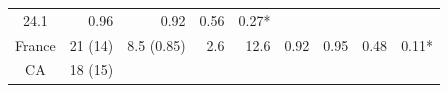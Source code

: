 \documentclass[fleqn,10pt,lineno]{wlpeerj} %
\theoremstyle{definition}
\theoremstyle{definition}
\theoremstyle{definition}
\theoremstyle{remark}
\begin{document}
\begin{longtable}[]{@{}crrrrllrl@{}}
\begin{minipage}[t]{0.05\columnwidth}
24.1\strut
\end{minipage} & \begin{minipage}[t]{0.11\columnwidth}\raggedright\strut
0.96\strut
\end{minipage} & \begin{minipage}[t]{0.06\columnwidth}\raggedright\strut
0.92\strut
\end{minipage} & \begin{minipage}[t]{0.06\columnwidth}\raggedleft\strut
0.56\strut
\end{minipage} & \begin{minipage}[t]{0.07\columnwidth}\raggedright\strut
0.27*\strut
\end{minipage}\tabularnewline
\begin{minipage}[t]{0.12\columnwidth}\centering\strut
France\strut
\end{minipage} & \begin{minipage}[t]{0.08\columnwidth}\raggedleft\strut
21 (14)\strut
\end{minipage} & \begin{minipage}[t]{0.13\columnwidth}\raggedleft\strut
8.5 (0.85)\strut
\end{minipage} & \begin{minipage}[t]{0.04\columnwidth}\raggedleft\strut
2.6\strut
\end{minipage} & \begin{minipage}[t]{0.05\columnwidth}\raggedleft\strut
12.6\strut
\end{minipage} & \begin{minipage}[t]{0.11\columnwidth}\raggedright\strut
0.92\strut
\end{minipage} & \begin{minipage}[t]{0.06\columnwidth}\raggedright\strut
0.95\strut
\end{minipage} & \begin{minipage}[t]{0.06\columnwidth}\raggedleft\strut
0.48\strut
\end{minipage} & \begin{minipage}[t]{0.07\columnwidth}\raggedright\strut
0.11*\strut
\end{minipage}\tabularnewline
\begin{minipage}[t]{0.12\columnwidth}\centering\strut
CA\strut
\end{minipage} & \begin{minipage}[t]{0.08\columnwidth}\raggedleft\strut
18 (15)\strut
\end{minipage} & \begin{minipage}[t]{0.13\columnwidth}\raggedleft\strut

\end{minipage}
\end{longtable}
\end{document}
